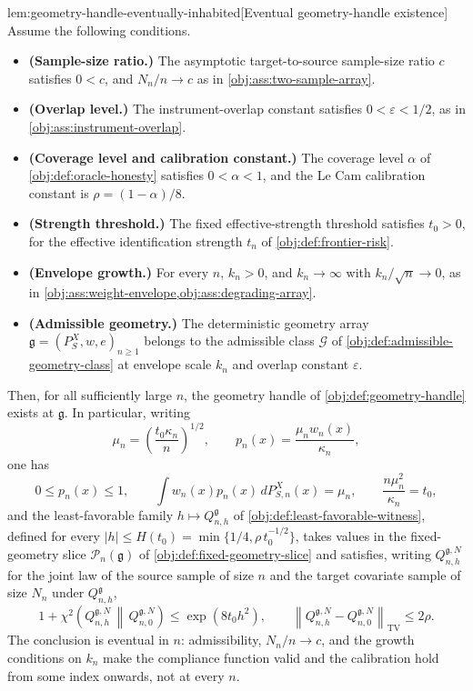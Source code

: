 \begin{lemmav}{lem:geometry-handle-eventually-inhabited}[Eventual geometry-handle existence]
Assume the following conditions.
\begin{itemize}
\item \textbf{(Sample-size ratio.)} The asymptotic target-to-source sample-size ratio \(c\) satisfies \(0<c\), and \(N_n/n\to c\) as in \cref{obj:ass:two-sample-array}.
\item \textbf{(Overlap level.)} The instrument-overlap constant satisfies \(0<\varepsilon<1/2\), as in \cref{obj:ass:instrument-overlap}.
\item \textbf{(Coverage level and calibration constant.)} The coverage level \(\alpha\) of \cref{obj:def:oracle-honesty} satisfies \(0<\alpha<1\), and the Le Cam calibration constant is \(\rho=(1-\alpha)/8\).
\item \textbf{(Strength threshold.)} The fixed effective-strength threshold satisfies \(t_0>0\), for the effective identification strength \(t_n\) of \cref{obj:def:frontier-risk}.
\item \textbf{(Envelope growth.)} For every \(n\), \(k_n>0\), and \(k_n\to\infty\) with \(k_n/\sqrt n\to0\), as in \cref{obj:ass:weight-envelope,obj:ass:degrading-array}.
\item \textbf{(Admissible geometry.)} The deterministic geometry array \(\mathfrak g=(P_S^X,w,e)_{n\ge1}\) belongs to the admissible class \(\mathcal G\) of \cref{obj:def:admissible-geometry-class} at envelope scale \(k_n\) and overlap constant \(\varepsilon\).
\end{itemize}
Then, for all sufficiently large \(n\), the geometry handle of \cref{obj:def:geometry-handle} exists at \(\mathfrak g\). In particular, writing
\[
\mu_n=\left(\frac{t_0\kappa_n}{n}\right)^{1/2},
\qquad
p_n(x)=\frac{\mu_n w_n(x)}{\kappa_n},
\]
one has
\[
0\le p_n(x)\le1,
\qquad
\int w_n(x)p_n(x)\,dP_{S,n}^X(x)=\mu_n,
\qquad
\frac{n\mu_n^2}{\kappa_n}=t_0,
\]
and the least-favorable family \(h\mapsto Q_{n,h}^{\mathfrak g}\) of \cref{obj:def:least-favorable-witness}, defined for every \(|h|\le H(t_0)=\min\{1/4,\rho\,t_0^{-1/2}\}\), takes values in the fixed-geometry slice \(\mathcal P_n(\mathfrak g)\) of \cref{obj:def:fixed-geometry-slice} and satisfies, writing \(Q_{n,h}^{\mathfrak g,N}\) for the joint law of the source sample of size \(n\) and the target covariate sample of size \(N_n\) under \(Q_{n,h}^{\mathfrak g}\),
\[
1+\chi^2\!\left(Q_{n,h}^{\mathfrak g,N}\,\middle\|\,Q_{n,0}^{\mathfrak g,N}\right)\le\exp(8t_0h^2),
\qquad
\left\|Q_{n,h}^{\mathfrak g,N}-Q_{n,0}^{\mathfrak g,N}\right\|_{\mathrm{TV}}\le2\rho .
\]
The conclusion is eventual in \(n\): admissibility, \(N_n/n\to c\), and the growth conditions on \(k_n\) make the compliance function valid and the calibration hold from some index onwards, not at every \(n\).
\end{lemmav}

